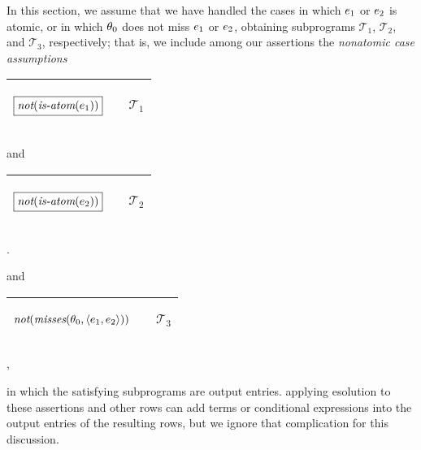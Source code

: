 \documentclass[runningheads]{llncs}
\DeclareMathOperator{\unot}{\emph{not}\kern-.0pt}
\DeclareMathOperator{\isatm}{\emph{is-atom}}
\begin{document}
In this section, we assume that we have handled the cases in which $e_{1}$ or $e_{2}$ is atomic, or in which $\theta_{0}$ does not miss $e_{1}$  or $e_{2}$, obtaining subprograms  $\mathcal{T_1}$, $\mathcal{T_2}$, and $\mathcal{T_3}$, respectively; that is, we include among our assertions the \emph{nonatomic case assumptions} 
  \begin{center}
  \begin{tabular}{|m{}|m{}||m{}|}
\hline
\begin{center}
$\boxed{{\unot(\isatm(\e{1}))}}$ 
\vspace{-15pt}
\end{center}  \hspace{1cm} 
&  & \begin{center}$\mathcal{T_1}$
\vspace{-5pt}\end{center}\\  \hline
\end{tabular}
\end{center} 
and
  \begin{center}
  \begin{tabular}{|m{}|m{}||m{}|}
\hline
\begin{center}
$\boxed{{\unot(\isatm(\e{2}))}} $  \vspace{-5pt}\hspace{1cm} 
\end{center}&  & \begin{center}$\mathcal{T_2}$ \vspace{-5pt}\end{center}\\  \hline
\end{tabular}.
\end{center} 
and
  \begin{center}
  \begin{tabular}{|m{}|m{}||m{}|}
\hline
\begin{center}
$\unot(\misses(\thet{0}, \langle \e{1}, \e{2} \rangle)) $  \vspace{-5pt}\hspace{1cm} 
\end{center}&  & \begin{center}$\mathcal{T_3}$ \vspace{-5pt}\end{center}\\  \hline
\end{tabular},
\end{center} 
in which the satisfying subprograms are output entries.  
applying esolution to these assertions and other rows can add terms or conditional expressions into the output entries of the resulting rows, but we ignore that complication for this discussion.
\end{document}
